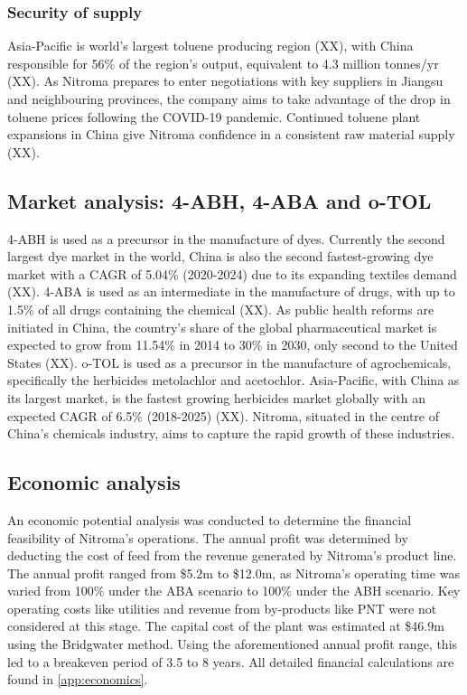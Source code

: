 \subsubsection{Security of supply}
Asia-Pacific is world's largest toluene producing region (XX), with China responsible for 56\% of the region’s output, equivalent to 4.3 million tonnes/yr (XX). As Nitroma prepares to enter negotiations with key suppliers in Jiangsu and neighbouring provinces, the company aims to take advantage of the drop in toluene prices following the COVID-19 pandemic. Continued toluene plant expansions in China give Nitroma confidence in a consistent raw material supply (XX).

\subsection{Market analysis: 4-ABH, 4-ABA and o-TOL}
4-ABH is used as a precursor in the manufacture of dyes. Currently the second largest dye market in the world, China is also the second fastest-growing dye market with a CAGR of 5.04\% (2020-2024) due to its expanding textiles demand (XX). 4-ABA is used as an intermediate in the manufacture of drugs, with up to 1.5\% of all drugs containing the chemical (XX). As public health reforms are initiated in China, the country’s share of the global pharmaceutical market is expected to grow from 11.54\% in 2014 to 30\% in 2030, only second to the United States (XX). o-TOL is used as a precursor in the manufacture of agrochemicals, specifically the herbicides metolachlor and acetochlor. Asia-Pacific, with China as its largest market, is the fastest growing herbicides market globally with an expected CAGR of 6.5\% (2018-2025) (XX). Nitroma, situated in the centre of China’s chemicals industry, aims to capture the rapid growth of these industries.  

\subsection{Economic analysis}
An economic potential analysis was conducted to determine the financial feasibility of Nitroma’s operations. The annual profit was determined by deducting the cost of feed from the revenue generated by Nitroma's product line. The annual profit ranged from \$5.2m to \$12.0m, as Nitroma's operating time was varied from 100\% under the ABA scenario to 100\% under the ABH scenario. Key operating costs like utilities and revenue from by-products like PNT were not considered at this stage. The capital cost of the plant was estimated at \$46.9m using the Bridgwater method. Using the aforementioned annual profit range, this led to a breakeven period of 3.5 to 8 years. All detailed financial calculations are found in \cref{app:economics}.